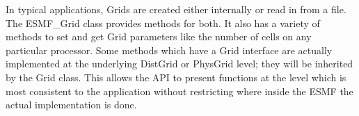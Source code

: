 


In typical applications, Grids are created either internally or read in from
a file.  The ESMF\_Grid class provides methods for both.  It also has a variety
of methods to set and get Grid parameters like the number of cells on any
particular processor.  Some methods which have a Grid interface are actually
implemented at the underlying DistGrid or PhysGrid level; they will be inherited
by the Grid class.  This allows the API to present functions at the level which
is most consistent to the application without restricting where inside the ESMF
the actual implementation is done.

